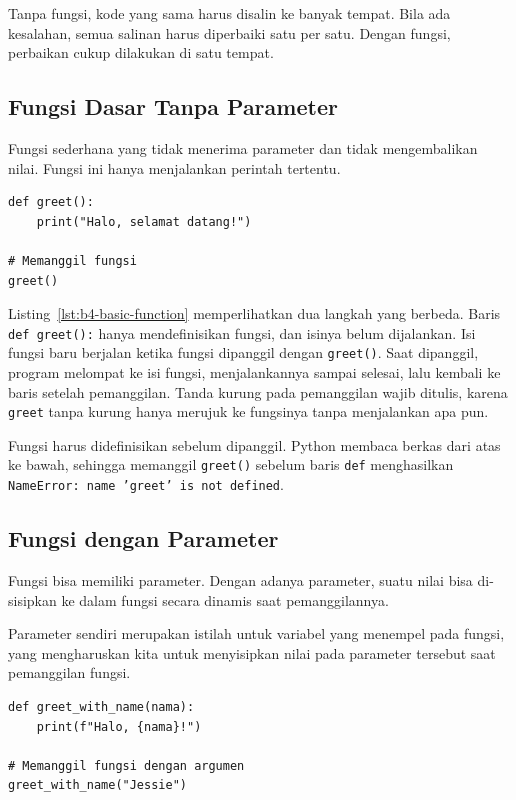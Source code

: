 Tanpa fungsi, kode yang sama harus disalin ke banyak tempat. Bila ada kesalahan, semua salinan harus diperbaiki satu per satu. Dengan fungsi, perbaikan cukup dilakukan di satu tempat.

\subsection{Fungsi Dasar Tanpa Parameter}

Fungsi sederhana yang tidak menerima parameter dan tidak mengembalikan nilai. Fungsi ini hanya menjalankan perintah tertentu.

\begin{lstlisting}[style=PythonStyle, caption={Kode Python: basic_function.py}, label={lst:b4-basic-function}]
def greet():
    print("Halo, selamat datang!")

# Memanggil fungsi
greet()
\end{lstlisting}

Listing~\ref{lst:b4-basic-function} memperlihatkan dua langkah yang berbeda. Baris \texttt{def greet():} hanya mendefinisikan fungsi, dan isinya belum dijalankan. Isi fungsi baru berjalan ketika fungsi dipanggil dengan \texttt{greet()}. Saat dipanggil, program melompat ke isi fungsi, menjalankannya sampai selesai, lalu kembali ke baris setelah pemanggilan. Tanda kurung pada pemanggilan wajib ditulis, karena \texttt{greet} tanpa kurung hanya merujuk ke fungsinya tanpa menjalankan apa pun.

Fungsi harus didefinisikan sebelum dipanggil. Python membaca berkas dari atas ke bawah, sehingga memanggil \texttt{greet()} sebelum baris \texttt{def} menghasilkan \texttt{NameError: name 'greet' is not defined}.

\subsection{Fungsi dengan Parameter}

Fungsi bisa memiliki parameter. Dengan adanya parameter, suatu nilai bisa di-sisipkan ke dalam fungsi secara dinamis saat pemanggilannya.

Parameter sendiri merupakan istilah untuk variabel yang menempel pada fungsi, yang mengharuskan kita untuk menyisipkan nilai pada parameter tersebut saat pemanggilan fungsi.

\begin{lstlisting}[style=PythonStyle, caption={Kode Python: parameter_function.py}, label={lst:b4-parameter-function}]
def greet_with_name(nama):
    print(f"Halo, {nama}!")

# Memanggil fungsi dengan argumen
greet_with_name("Jessie")
\end{lstlisting}

